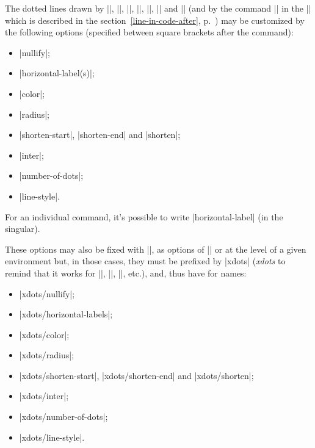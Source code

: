 \documentclass[dvipsnames]{article}
\begin{document}
\label{customisation} 

The dotted lines drawn by |\Ldots|, |\Cdots|, |\Vdots|, |\Ddots|, |\Iddots|,
|\Hdotsfor| and |\Vdotsfor| (and by the command |\line| in the |\CodeAfter|
which is described in the section~\ref{line-in-code-after},
p.~\pageref{line-in-code-after}) may be customized by the following options
(specified between square brackets after the command):
\begin{itemize}
\item |nullify|; 
\item |horizontal-label(s)|;
\item |color|;
\item |radius|;
\item |shorten-start|, |shorten-end| and |shorten|;
\item |inter|;
\item |number-of-dots|;
\item |line-style|.
\end{itemize}

\smallskip
For an individual command, it's possible to write |horizontal-label| (in the
singular). 

\smallskip
These options may also be fixed with |\NiceMatrixOptions|, as options of
|\CodeAfter| or at the level of a given environment but, in those cases, they
must be prefixed by |xdots| (\textsl{xdots} to remind that it works for
|\Cdots|, |\Ldots|, |\Vdots|, etc.), and, thus have for names:
\begin{itemize}
\item |xdots/nullify|;
\item |xdots/horizontal-labels|;
\item |xdots/color|;
\item |xdots/radius|;
\item |xdots/shorten-start|, |xdots/shorten-end| and |xdots/shorten|;
\item |xdots/inter|;
\item |xdots/number-of-dots|;
\item |xdots/line-style|.
\end{itemize}
\end{document}
